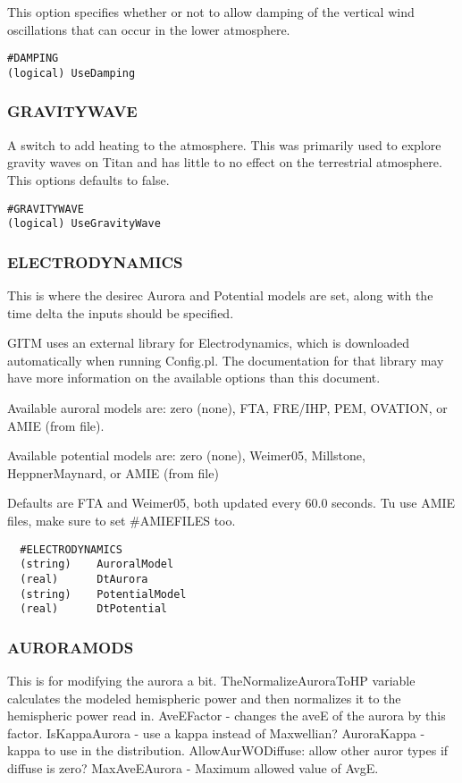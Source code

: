 This option specifies whether or not to allow damping of the vertical wind oscillations that can occur in the lower atmosphere.

\begin{verbatim}
#DAMPING
(logical) UseDamping        
\end{verbatim}

\subsubsection{GRAVITYWAVE}
\label{gravitywave.sec}
A switch to add heating to the atmosphere.  This was primarily used to explore gravity waves on Titan and has little to no effect on the terrestrial atmosphere.  This options defaults to false.

\begin{verbatim}
#GRAVITYWAVE
(logical) UseGravityWave
\end{verbatim}

\subsubsection{ELECTRODYNAMICS}
\label{edynamics.sec}
This is where the desirec Aurora and Potential models are set, along with the time delta the inputs should be specified.

GITM uses an external library for Electrodynamics, which is downloaded automatically when running Config.pl. The documentation for that library may have more information on the available options than this document.

Available auroral models are: zero (none), FTA, FRE/IHP, PEM, OVATION, or AMIE (from file).

Available potential models are: zero (none), Weimer05, Millstone, HeppnerMaynard, or AMIE (from file)

Defaults are FTA and Weimer05, both updated every 60.0 seconds. Tu use AMIE files, make sure to set \#AMIEFILES too.

\begin{verbatim}
  #ELECTRODYNAMICS
  (string)    AuroralModel
  (real)      DtAurora
  (string)    PotentialModel
  (real)      DtPotential
\end{verbatim}


\subsubsection{AURORAMODS}
\label{auroramods.sec}

This is for modifying the aurora a bit.  TheNormalizeAuroraToHP variable calculates the modeled hemispheric power and then normalizes it to the hemispheric power read in. AveEFactor - changes the aveE of the aurora by this factor. IsKappaAurora - use a kappa instead of Maxwellian? AuroraKappa - kappa to use in the distribution. AllowAurWODiffuse: allow other auror types if diffuse is zero? MaxAveEAurora - Maximum allowed value of AvgE.



